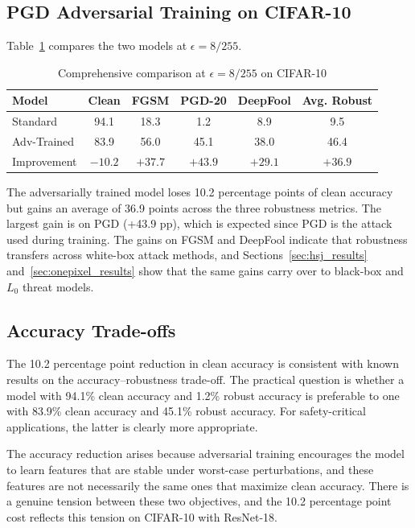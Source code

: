 \subsection{PGD Adversarial Training on CIFAR-10}

Table~\ref{tab:adv_training_comparison} compares the two models at $\epsilon = 8/255$.

\begin{table}[htbp]
    \centering
    \caption{Comprehensive comparison at $\epsilon = 8/255$ on CIFAR-10}
    \label{tab:adv_training_comparison}
    \begin{tabular}{lccccc}
        \toprule
        \textbf{Model} & \textbf{Clean} & \textbf{FGSM} & \textbf{PGD-20} & \textbf{DeepFool} & \textbf{Avg. Robust} \\
        \midrule
        Standard & 94.1 & 18.3 & 1.2 & 8.9 & 9.5 \\
        Adv-Trained & 83.9 & 56.0 & 45.1 & 38.0 & 46.4 \\
        \midrule
        Improvement & $-10.2$ & $+37.7$ & $+43.9$ & $+29.1$ & $+36.9$ \\
        \bottomrule
    \end{tabular}
\end{table}

The adversarially trained model loses 10.2 percentage points of clean accuracy but gains an average of 36.9 points across the three robustness metrics. The largest gain is on PGD (+43.9 pp), which is expected since PGD is the attack used during training. The gains on FGSM and DeepFool indicate that robustness transfers across white-box attack methods, and Sections~\ref{sec:hsj_results} and~\ref{sec:onepixel_results} show that the same gains carry over to black-box and $L_0$ threat models.

\subsection{Accuracy Trade-offs}
\label{sec:tradeoffs}

The 10.2 percentage point reduction in clean accuracy is consistent with known results on the accuracy--robustness trade-off. The practical question is whether a model with 94.1\% clean accuracy and 1.2\% robust accuracy is preferable to one with 83.9\% clean accuracy and 45.1\% robust accuracy. For safety-critical applications, the latter is clearly more appropriate.

The accuracy reduction arises because adversarial training encourages the model to learn features that are stable under worst-case perturbations, and these features are not necessarily the same ones that maximize clean accuracy. There is a genuine tension between these two objectives, and the 10.2 percentage point cost reflects this tension on CIFAR-10 with ResNet-18.

